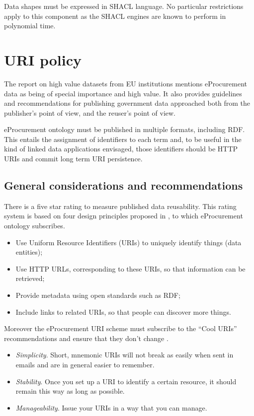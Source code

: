 	Data shapes must be expressed in SHACL language. No particular restrictions apply to this component as the SHACL engines are known to perform in polynomial time. 
	
\section{URI policy}
\label{sec:uri-policy}

	The report on high value datasets from EU institutions \citep{d-high-value-assets} mentions eProcurement data as being of special importance and high value. It also provides guidelines and recommendations for  publishing government data approached both from the publisher's point of view, and the reuser's point of view. 
	
	eProcurement ontology must be published in multiple formats, including RDF. This entails the assignment of identifiers to each term and, to be useful in the kind of linked data applications envisaged, those identifiers should be HTTP URIs and commit long term URI persistence.
	
	\subsection{General considerations and recommendations}
	\label{sec:considerations}
	There is a five star rating \cite{berners5star} to measure published data reusability. This rating system is based on four design principles proposed in \citet{berners2006linked}, to which eProcurement ontology subscribes.
	
	\begin{itemize}
		\item Use Uniform Resource Identifiers (URIs) to uniquely identify
		things (data entities);
		\item Use HTTP URLs, corresponding to these URIs, so that
		information can be retrieved;
		\item Provide metadata using open standards such as RDF;
		\item Include links to related URIs, so that people can discover more
		things.		
	\end{itemize} 
	
	Moreover the eProcurement URI scheme must subscribe to the ``Cool URIs'' recommendations \cite{cool-uri-cyganiak} and ensure that they don't change \cite{burners1998cool}. 
	
	\begin{itemize}
		\item \textit{Simplicity}. Short, mnemonic URIs will not break as easily when sent in emails and are in general easier to remember.
		\item \textit{Stability}. Once you set up a URI to identify a certain resource, it should remain this way as long as possible.
		\item  \textit{Manageability}. Issue your URIs in a way that you can manage. \cite{cool-uri-cyganiak}
	\end{itemize}


